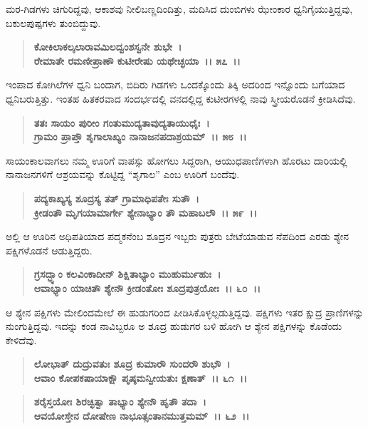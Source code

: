 ಮರ-ಗಿಡಗಳು ಚಿಗುರಿದ್ದವು, ಆಕಾಶವು ನೀಲಿಬಣ್ಣದಿಂದಿತ್ತು, ಮದಿಸಿದ ದುಂಬಿಗಳು ಝೇಂಕಾರ ಧ್ವನಿಗೈಯುತ್ತಿದ್ದವು, ಬಕುಲಪುಷ್ಪಗಳು ತುಂಬಿದ್ದುವು.

\begin{verse}
\textbf{ಕೋಕಿಲಾಕಲ್ಕಲಾರಾವಮಿಲದ್ವಂಶಸ್ವನೇ ಶುಭೇ~।}\\\textbf{ರೇಮಾತೇ ರಮಣೀಪ್ರಾಣೌ ಕುಟೀರೇಷು ಯಥೇಚ್ಛಯಾ~।। ೫೭~।। }
\end{verse}

ಇಂಪಾದ ಕೋಗಿಲೆಗಳ ಧ್ವನಿ ಬಂದಾಗ, ಬಿದಿರು ಗಿಡಗಳು ಒಂದಕ್ಕೊಂದು ತಿಕ್ಕಿ ಅದರಿಂದ ಇನ್ನೊಂದು ಬಗೆಯಾದ ಧ್ವನಿಬರುತ್ತಿತ್ತು. ಇಂತಹ ಹಿತಕರವಾದ ಸಂದರ್ಭದಲ್ಲಿ ವನದಲ್ಲಿದ್ದ ಕುಟೀರಗಳಲ್ಲಿ ನಾವು ಸ್ತ್ರೀಯರೊಡನೆ ಕ್ರೀಡಿಸಿದೆವು.

\begin{verse}
\textbf{ತತಃ ಸಾಯಂ ಪುರೀಂ ಗಂತುಮುದ್ಯತಾವುದ್ಯತಾಯುಧೈಃ~।}\\\textbf{ಗ್ರಾಮಂ ಪ್ರಾಪ್ತೌ ಶೃಗಾಲಾಖ್ಯಂ ನಾನಾಜನಪದಾಶ್ರಯಮ್~।। ೫೮~।। }
\end{verse}

ಸಾಯಂಕಾಲವಾಗಲು ನಮ್ಮ ಊರಿಗೆ ವಾಪಸ್ಸು ಹೋಗಲು ಸಿದ್ದರಾಗಿ, ಆಯುಧಪಾಣಿಗಳಾಗಿ ಹೊರಟು ದಾರಿಯಲ್ಲಿ ನಾನಾಜನಗಳಿಗೆ ಆಶ್ರಯವನ್ನು ಕೊಟ್ಟಿದ್ದ “ಶೃಗಾಲ” ಎಂಬ ಊರಿಗೆ ಬಂದೆವು.

\begin{verse}
\textbf{ಪದ್ಯಕಾಖ್ಯಸ್ಯ ಶೂದ್ರಸ್ಯ ತತ್ ಗ್ರಾಮಾಧಿಪತೇಃ ಸುತೌ~।}\\\textbf{ಕ್ರೀಡಂತೌ ಮೃಗಯಾಮಾರ್ಗೇ ಶ್ಯೇನಾಭ್ಯಾಂ ತೌ ಮಹಾಬಲೌ~।। ೫೯~।।}
\end{verse}

ಅಲ್ಲಿ ಆ ಊರಿನ ಅಧಿಪತಿಯಾದ ಪದ್ಮಕನೆಂಬ ಶೂದ್ರನ ಇಬ್ಬರು ಪುತ್ರರು ಬೇಟೆಯಾಡುವ ನೆಪದಿಂದ ಎರಡು ಶ್ಯೇನ ಪಕ್ಷಿಗಳೊಡನೆ ಆಡುತ್ತಿದ್ದರು.

\begin{verse}
\textbf{ಗ್ರಸದ್ಭ್ಯಾಂ ಕಲವಿಂಕಾದೀನ್ ಶಿಕ್ಷಿತಾಭ್ಯಾಂ ಮುಹುರ್ಮುಹುಃ~।}\\\textbf{ಆವಾಭ್ಯಾಂ ಯಾಚಿತೌ ಶ್ಯೇನೌ ಕ್ರೀಡಂತೋಃ ಶೂದ್ರಪುತ್ರಯೋಃ~।। ೬೦~।।}
\end{verse}

ಆ ಶ್ಯೇನ ಪಕ್ಷಿಗಳು ಮೇಲಿಂದಮೇಲೆ ಈ ಹುಡುಗರಿಂದ ಪೀಡಿಸಿಕೊಳ್ಳಲ್ಪಡುತ್ತಿದ್ದವು. ಪಕ್ಷಿಗಳು ಇತರ ಕ್ಷುದ್ರ ಪ್ರಾಣಿಗಳನ್ನು ನುಂಗುತ್ತಿದ್ದವು. ಇದನ್ನು ಕಂಡ ನಾವಿಬ್ಬರೂ ಅ ಶೂದ್ರ ಹುಡುಗರ ಬಳಿ ಹೋಗಿ ಆ ಶ್ಯೇನ ಪಕ್ಷಿಗಳನ್ನು ಕೊಡೆಂದು ಕೇಳಿದೆವು.

\begin{verse}
\textbf{ಲೋಭಾತ್ ದುದ್ರುವತುಃ ಶೂದ್ರ ಕುಮಾರೌ ಸುಂದರೌ ಶುಭೌ~।}\\\textbf{ಆವಾಂ ಕೋಪಕಷಾಯಾಕ್ಷೌ ಪೃಷ್ಠಮನ್ವೀಯತುಃ ಕ್ಷಣಾತ್~।। ೬೧~।।} 
\end{verse}

\begin{verse}
\textbf{ಶರೈಸ್ತಯೋಃ ಶಿರಚ್ಛಿತ್ವಾ ತಾಭ್ಯಾಂ ಶ್ಯೇನೌ ಹೃತೌ ತದಾ~।}\\\textbf{ಆವಯೋಸ್ತೇನ ದೋಷೇಣ ನಾಭೂತ್ಸಂತಾನಮುತ್ತಮಮ್~।। ೬೨~।।}
\end{verse}

